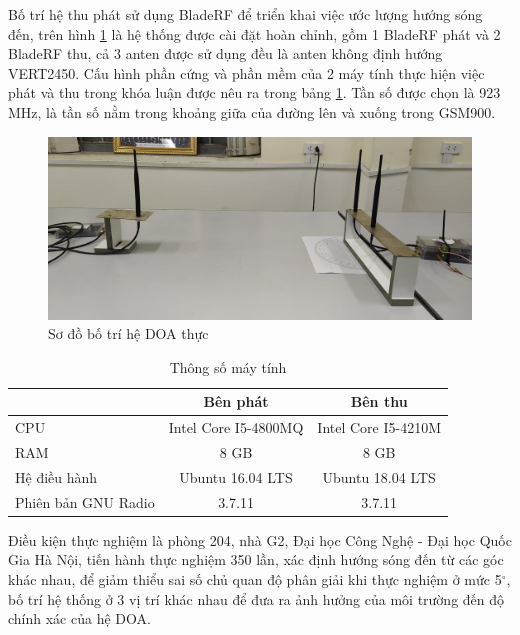 Bố trí hệ thu phát sử dụng BladeRF để triển khai việc ước lượng hướng sóng đến, trên hình \ref{fig:realsys} là hệ thống được cài đặt hoàn chỉnh, gồm 1 BladeRF phát và 2 BladeRF thu, cả 3 anten được sử dụng đều là anten không định hướng VERT2450. Cấu hình phần cứng và phần mềm của 2 máy tính thực hiện việc phát và thu trong khóa luận được nêu ra trong bảng \ref{table:hw}. Tần số được chọn là 923 MHz, là tần số nằm trong khoảng giữa của đường lên và xuống trong GSM900.
\begin{figure} [!h]
	\centering
	\includegraphics[width=1\linewidth]{figures/realsys.jpg}
	\caption{Sơ đồ bố trí hệ DOA thực}
	\label{fig:realsys}
\end{figure}
\begin{table}[!h]
\centering
\caption{Thông số máy tính}
\begin{tabular}{|l|c|c|} 
	\hline
	\rowcolor[rgb]{1,0.91,0.906} \multicolumn{1}{|c|}{ \textbf{Thông số} } & \textbf{Bên phát}    & \textbf{Bên thu}     \\ 
	\hline
	CPU                                                                    & Intel Core I5-4800MQ & Intel Core I5-4210M  \\ 
	\hline
	RAM                                                                    & 8 GB                 & 8 GB                 \\ 
	\hline
	Hệ điều hành                                                           & Ubuntu 16.04 LTS     & Ubuntu 18.04 LTS     \\ 
	\hline
	Phiên bản GNU Radio                                                    & 3.7.11               & 3.7.11               \\
	\hline
\end{tabular}
\label{table:hw}
\end{table}

Điều kiện thực nghiệm là phòng 204, nhà G2, Đại học Công Nghệ - Đại học Quốc Gia Hà Nội, tiến hành thực nghiệm 350 lần, xác định hướng sóng đến từ các góc khác nhau, để giảm thiểu sai số chủ quan độ phân giải khi thực nghiệm ở mức 5$^{\circ}$, bố trí hệ thống ở 3 vị trí khác nhau để đưa ra ảnh hưởng của môi trường đến độ chính xác của hệ DOA.
\newpage
